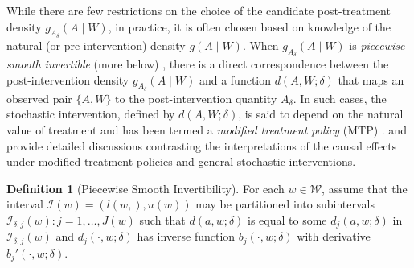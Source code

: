 \documentclass[
  12pt, krantz2,
]{krantz}
\newcommand{\1}{\mathbbm{1}}
\theoremstyle{definition}
\newtheorem{definition}{Definition}[chapter]
\theoremstyle{definition}
\theoremstyle{definition}
\theoremstyle{definition}
\theoremstyle{remark}
\begin{document}
While there are few restrictions on the choice of the candidate post-treatment
density \(g_{A_{\delta}}(A \mid W)\), in practice, it is often chosen based on
knowledge of the natural (or pre-intervention) density \(g(A \mid W)\). When
\(g_{A_{\delta}}(A \mid W)\) is \emph{piecewise smooth invertible} (more below)
\citep{haneuse2013estimation}, there is a direct correspondence between the
post-intervention density \(g_{A_{\delta}}(A \mid W)\) and a function \(d(A, W; \delta)\) that maps an observed pair \(\{A, W\}\) to the post-intervention quantity
\(A_{\delta}\). In such cases, the stochastic intervention, defined by \(d(A, W; \delta)\), is said to depend on the natural value of treatment and has been
termed a \emph{modified treatment policy} (MTP) \citep{haneuse2013estimation, diaz2018stochastic, hejazi2021semiparametric}. \citet{haneuse2013estimation} and
\citet{young2014identification} provide detailed discussions contrasting the
interpretations of the causal effects under modified treatment policies and
general stochastic interventions.

\begin{definition}[Piecewise Smooth Invertibility]
For each \(w \in \mathcal{W}\), assume that the interval \(\mathcal{I}(w) = (l(w,), u(w))\) may be partitioned into subintervals \(\mathcal{I}_{\delta,j}(w): j = 1, \ldots, J(w)\) such that \(d(a, w; \delta)\) is equal to some \(d_j(a, w; \delta)\) in \(\mathcal{I}_{\delta,j}(w)\) and \(d_j(\cdot,w; \delta)\) has inverse
function \(b_j(\cdot, w; \delta)\) with derivative \(b_j'(\cdot, w; \delta)\).
\end{definition}
\end{document}
